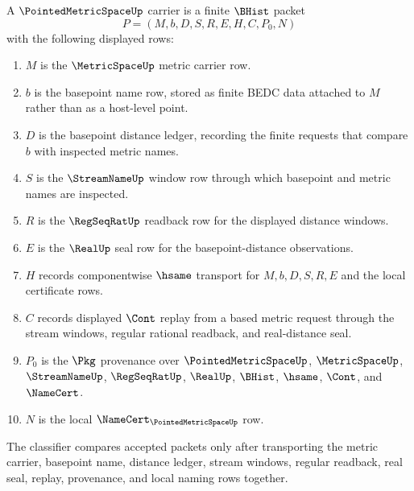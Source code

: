 \begin{definition}
\label{def:pointed-metric-space-carrier}
A $\PointedMetricSpaceUp$ carrier is a finite $\BHist$ packet
$$
P=(M,b,D,S,R,E,H,C,P_0,N)
$$
with the following displayed rows:
\begin{enumerate}
\item $M$ is the $\MetricSpaceUp$ metric carrier row.
\item $b$ is the basepoint name row, stored as finite BEDC data attached to
$M$ rather than as a host-level point.
\item $D$ is the basepoint distance ledger, recording the finite requests
that compare $b$ with inspected metric names.
\item $S$ is the $\StreamNameUp$ window row through which basepoint and metric
names are inspected.
\item $R$ is the $\RegSeqRatUp$ readback row for the displayed distance
windows.
\item $E$ is the $\RealUp$ seal row for the basepoint-distance observations.
\item $H$ records componentwise $\hsame$ transport for $M,b,D,S,R,E$ and the
local certificate rows.
\item $C$ records displayed $\Cont$ replay from a based metric request through
the stream windows, regular rational readback, and real-distance seal.
\item $P_0$ is the $\Pkg$ provenance over $\PointedMetricSpaceUp$,
$\MetricSpaceUp$, $\StreamNameUp$, $\RegSeqRatUp$, $\RealUp$, $\BHist$,
$\hsame$, $\Cont$, and $\NameCert$.
\item $N$ is the local $\NameCert_{\PointedMetricSpaceUp}$ row.
\end{enumerate}
The classifier compares accepted packets only after transporting the metric
carrier, basepoint name, distance ledger, stream windows, regular readback,
real seal, replay, provenance, and local naming rows together.
\end{definition}

